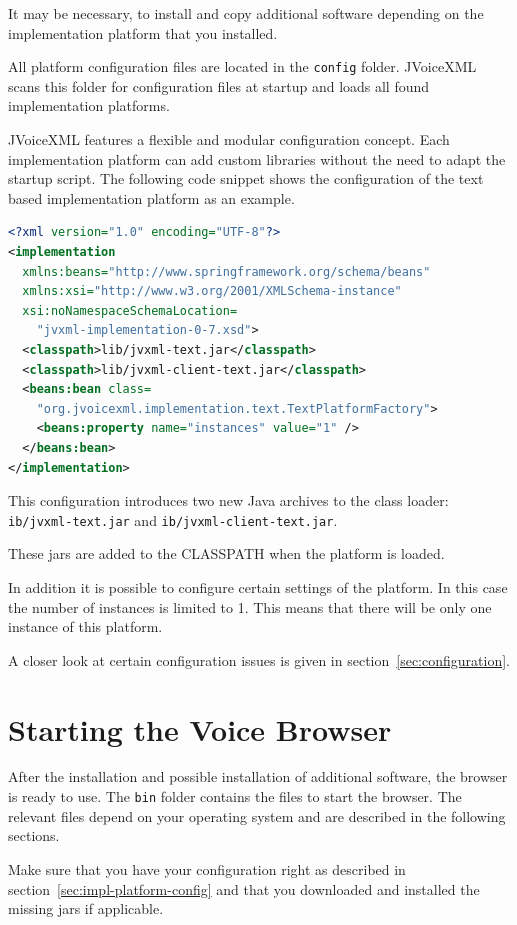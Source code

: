 \documentclass[11pt,a4paper]{article}
\begin{document}
It may be necessary, to install and copy additional software depending on the
implementation platform that you installed.

All platform configuration files are located in the \lstinline{config} folder.
JVoiceXML scans this folder for configuration files at startup and loads all found
implementation platforms.

JVoiceXML features a flexible and modular configuration concept. Each
implementation platform can add custom libraries without the need to adapt the
startup script. The following code snippet shows the configuration of the text
based implementation platform as an example.

\begin{lstlisting}[language=XML]
<?xml version="1.0" encoding="UTF-8"?>
<implementation
  xmlns:beans="http://www.springframework.org/schema/beans"
  xmlns:xsi="http://www.w3.org/2001/XMLSchema-instance"
  xsi:noNamespaceSchemaLocation=
    "jvxml-implementation-0-7.xsd">
  <classpath>lib/jvxml-text.jar</classpath>
  <classpath>lib/jvxml-client-text.jar</classpath>
  <beans:bean class=
    "org.jvoicexml.implementation.text.TextPlatformFactory">
    <beans:property name="instances" value="1" />
  </beans:bean>
</implementation>
\end{lstlisting}

This configuration introduces two new Java archives to the class loader:
\lstinline{ib/jvxml-text.jar} and \lstinline{ib/jvxml-client-text.jar}.

These jars are added to the CLASSPATH when the platform is loaded.

In addition it is possible to configure certain settings of the platform. In
this case the number of instances is limited to 1. This means that there will be
only one instance of this platform.

A closer look at certain configuration issues is given in
section~\ref{sec:configuration}.

\section{Starting the Voice Browser}

After the installation and possible installation of additional software, the
browser is ready to use. The \texttt{bin} folder contains the files to start
the browser. The relevant files depend on your operating system and are
described in the following sections.

Make sure that you have your configuration right as described in
section~\ref{sec:impl-platform-config} and that you downloaded and installed
the missing jars if applicable.
\end{document}
